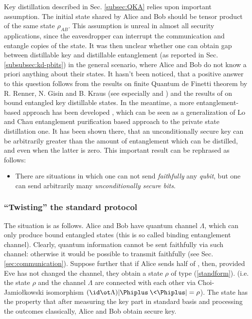 \documentclass[rmp,12pt,preprint]{revtex4-2}
\begin{document}
Key distillation described in Sec. \ref{subsec:QKA} relies upon
important assumption. The initial state shared by Alice and Bob
should be tensor product of the same state $\rho_{AB}$. This
assumption is unreal in almost all security applications, since the
eavesdropper can interrupt the communication and entangle copies of
the state. It was then unclear whether one can obtain gap between
distillable key and distillable entanglement (as reported in Sec.
\ref{subsubsec:kd-pbits}) in the general scenario, where Alice and
Bob do not know a priori anything about their states. It hasn't been noticed,
that a positive answer to this question follows from the results on
finite Quantum de Finetti theorem by R. Renner, N. Gisin and B.
Kraus \cite{RGKinfo_sec_proof_short,RGKinfo_sec_proof_long} (see
especially \cite{RR-phd} and \cite{KRdeFinetti}) and the results of
\cite{pptkey} on bound entangled key distillable states. In
the meantime, a more entanglement-based approach has been developed
\cite{bigkey,GeneralUncSec}, which can be seen as a
generalization of Lo and Chau entanglement purification based
approach to the private state distillation one. It has been shown
there, that an unconditionally secure key can be arbitrarily greater
than the amount of entanglement which can be distilled, and even
when the latter is zero. This important result can be rephrased as
follows:
\begin{itemize}
\item There are situations in which one can not send {\it faithfully} any {\it qubit}, but one can send arbitrarily many {\it unconditionally secure  bits}.
\end{itemize}

\subsubsection{``Twisting'' the standard protocol}

The situation is as follows. Alice and Bob have quantum channel
$\Lambda$, which can only produce bound entangled states (this is so
called binding entanglement channel). Clearly, quantum information
cannot be sent faithfully via such channel: otherwise it would be
possible to transmit faithfully  \singlets (see Sec. \ref{sec:communication}). Suppose further that if
Alice sends half of \wsinglet, then, provided Eve has not changed
the channel, they obtain a state $\rho$ of type (\ref{standform}).
(i.e. the state $\rho$ and the channel $\Lambda$ are connected with
each other via Choi-Jamio\l{}kowski isomorphism $(\id\ot
\Lambda)|\Phiplus\>\<\Phiplus|=\rho$). The state has the property that
after measuring the key part in standard basis and processing the
outcomes classically, Alice and Bob obtain secure key.
\end{document}
